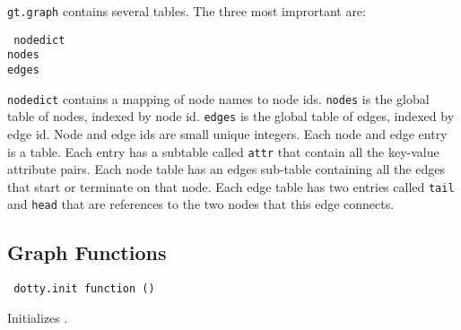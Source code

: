 \vspace{10pt}
\noindent
{\tt gt.graph} contains several tables. The three most imprortant are:

\begin{flushleft}\tt
nodedict\\
nodes\\
edges\\
\end{flushleft}\vspace{-2\itemsep}
{\tt nodedict} contains a mapping of node names to node ids. {\tt nodes} is the
global table of nodes, indexed by node id. {\tt edges} is the global table of
edges, indexed by edge id. Node and edge ids are small unique integers.  Each
node and edge entry is a table. Each entry has a subtable called {\tt attr}
that contain all the key-value attribute pairs. Each node table has an edges
sub-table containing all the edges that start or terminate on that node.  Each
edge table has two entries called {\tt tail} and {\tt head} that are references
to the two nodes that this edge connects.

\subsection{Graph Functions}

\begin{flushleft}\tt
dotty.init function ()\\
\end{flushleft}\vspace{-2\itemsep}
Initializes {\DOTTY}.

